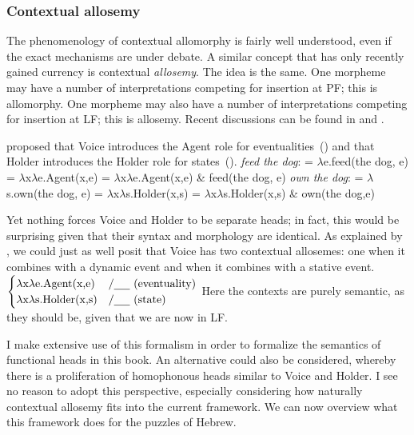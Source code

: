 		\subsubsection{Contextual allosemy}
The phenomenology of contextual allomorphy is fairly well understood, even if the exact mechanisms are under debate. A similar concept that has only recently gained currency is contextual \emph{allosemy}. The idea is the same. One morpheme may have a number of interpretations competing for insertion at PF; this is allomorphy. One morpheme may also have a number of interpretations competing for insertion at LF; this is allosemy. Recent discussions can be found in \cite{woodmarantz17} and \cite{mylermarantz19cup}.

\cite{kratzer96} proposed that Voice introduces the Agent role for eventualities~(\nextx) and that Holder introduces the Holder role for states~(\anextx).
\pex \emph{feed the dog}:
	\a {} = $\lambda$e.feed(the dog, e)
	\a {} = $\lambda$x$\lambda$e.Agent(x,e)
	\a {} = $\lambda$x$\lambda$e.Agent(x,e) \& feed(the dog, e)
\xe
\pex \emph{own the dog}:
	\a {} = $\lambda$s.own(the dog, e)
	\a {} = $\lambda$x$\lambda$s.Holder(x,s)
	\a {} = $\lambda$x$\lambda$s.Holder(x,s) \& own(the dog,e)
\xe

Yet nothing forces Voice and Holder to be separate heads; in fact, this would be surprising given that their syntax and morphology are identical. As explained by \cite{wood15springer}, we could just as well posit that Voice has two contextual allosemes: one when it combines with a dynamic event and when it combines with a stative event.
\ex {} \lra~ $\begin{cases}
	\lambda\text{x}\lambda\text{e.Agent(x,e)} & / \trace~ \text{(eventuality)} \\
	\lambda\text{x}\lambda\text{s.Holder(x,s)} & / \trace~ \text{(state)} \\
	\end{cases}$ 
\xe
Here the contexts are purely semantic, as they should be, given that we are now in LF.

I make extensive use of this formalism in order to formalize the semantics of functional heads in this book. An alternative could also be considered, whereby there is a proliferation of homophonous heads similar to Voice and Holder. I see no reason to adopt this perspective, especially considering how naturally contextual allosemy fits into the current framework. We can now overview what this framework does for the puzzles of Hebrew.


